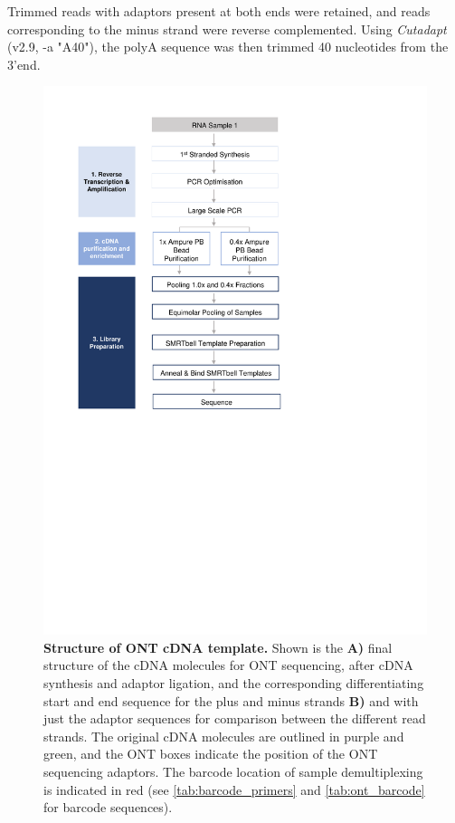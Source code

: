 Trimmed reads with adaptors present at both ends were retained, and reads corresponding to the minus strand were reverse complemented. Using \textit{Cutadapt}\cite{Martin2011} (v2.9, -a "A{40}"), the polyA sequence was then trimmed 40 nucleotides from the 3'end.

\begin{figure}[ht]
	\begin{center}
		\includegraphics[page=22,trim={0cm 18cm 0cm 1cm},clip, scale = 0.7]{Figures/ProjectDevelopment_Figures.pdf}
	\end{center}
	\captionsetup{width=0.95\textwidth}
	\caption[Structure of ONT cDNA template]%
	{\textbf{Structure of ONT cDNA template.} Shown is the \textbf{A)} final structure of the cDNA molecules for ONT sequencing, after cDNA synthesis and adaptor ligation, and the corresponding differentiating start and end sequence for the plus and minus strands \textbf{B)} and with just the adaptor sequences for comparison between the different read strands. The original cDNA molecules are outlined in purple and green, and the ONT boxes indicate the position of the ONT sequencing adaptors. The barcode location of sample demultiplexing is indicated in red (see \cref{tab:barcode_primers} and \cref{tab:ont_barcode} for barcode sequences). 
}
\end{figure}

